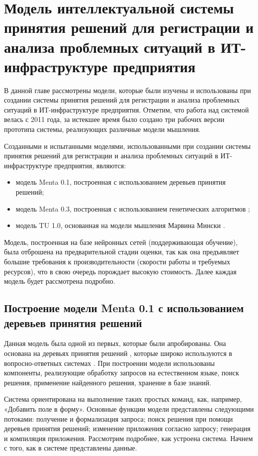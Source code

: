\chapter{Модель интеллектуальной системы принятия решений для регистрации и анализа проблемных ситуаций в ИТ-инфраструктуре предприятия} \label{chapt3}

В данной главе рассмотрены модели, которые были изучены и использованы при создании системы принятия решений для регистрации и анализа проблемных ситуаций в ИТ-инфраструктуре предприятия. Отметим, что работа над системой велась с 2011 года, за истекшее время было создано три рабочих версии прототипа системы, реализующих различные модели мышления. \par
Созданными и испытанными моделями, использованными при создании системы принятия решений для регистрации и анализа проблемных ситуаций в ИТ-инфраструктуре предприятия, являются:
 \begin{itemize}
	\item модель Menta 0.1, построенная с использованием деревьев принятия решений;
	\item модель Menta 0.3, построенная с использованием генетических алгоритмов \cite{ArtificialIntelligence} ;
	\item модель TU 1.0, основанная на модели мышления Марвина Мински  \cite{EmotionMachine}.
\end{itemize}

Модель, построенная на базе нейронных сетей (поддерживающая обучение), была отброшена на предварительной стадии оценки, так как она предъявляет большие требования к производительности (скорости работы и требуемых ресурсов)\cite{NEURAL}, что в свою очередь порождает высокую стоимость. Далее каждая модель будет рассмотрена подробно.


\section{Построение модели Menta 0.1 с использованием деревьев принятия решений} \label{sect3_1}
Данная модель была одной из первых, которые были апробированы. Она основана на деревьях принятия решений \cite{DTREE}, которые широко используются в вопросно-ответных системах \cite{DC1, DC2, DC3}. При построении модели использованы компоненты, реализующие обработку запросов на естественном языке, поиск решения, применение найденного решения, хранение в базе знаний.\par
Система ориентирована на выполнение таких простых команд, как, например, «Добавить поле в форму». Основные функции модели представлены следующими потоками: получение и формализация запроса; поиск решения при помощи деревьев принятия решений; изменение приложения согласно запросу; генерация и компиляция приложения. Рассмотрим подробнее, как устроена система. Начнем с того, как в системе представлены данные.

